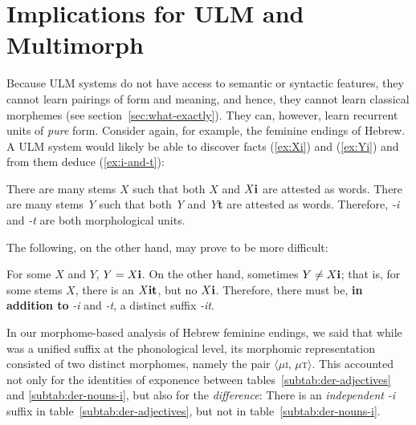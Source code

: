 \section{Implications for ULM and Multimorph}

Because ULM systems do not have access to
semantic or syntactic features, they cannot learn pairings of form and meaning, 
and hence, they cannot learn classical morphemes (see section~\ref{sec:what-exactly}). 
They can, however, learn recurrent units of \emph{pure} form. 
Consider again, 
for example, the feminine endings of Hebrew. A ULM system would likely be 
able to discover facts (\ref{ex:Xi}) and (\ref{ex:Yi}) and from them deduce (\ref{ex:i-and-t}): 
\begin{exe} \label{ex:observations1}
\ex \label{ex:Xi} There are many stems $X$ such that both $X$ and $X\text{\textbf{i}}$ are 
attested as words.
 \ex \label{ex:Yi} There are many stems \textit{Y} such that both \textit{Y} and \textit{Y}\textbf{t} 
 are attested as words.
\ex Therefore, \textit{-i} and \textit{-t} are both morphological units. \label{ex:i-and-t}
\end{exe}

The following, on the other hand, may prove to be more difficult:
\begin{exe} \label{ex:observations2}
\ex  \label{ex:YequalsXi} For some $X$ and $Y$, $Y=X\text{\textbf{i}}$. 
\ex  \label{ex:YneXi} On the other hand, sometimes $Y \ne X\text{\textbf{i}}$; that is, for some stems 
$X$, there is an $X\text{\textbf{it}}$, but no $X\text{\textbf{i}}$. 
\ex Therefore, there must be, \textbf{in addition to} \textit{-i} and \textit{-t}, 
a distinct suffix \textit{-it}.
\end{exe}
In our morphome-based analysis of Hebrew feminine endings, we said 
that while  was a unified suffix at the phonological level, its morphomic 
representation consisted of two distinct morphomes, namely the pair 
$\langle$$\mu$\textsc{i}, $\mu$\textsc{t}$\rangle$. 
This accounted
 not only for the identities of exponence between tables~\ref{subtab:der-adjectives} 
and \ref{subtab:der-nouns-i}, but also for the \emph{difference}: There is an \emph{independent} \textit{-i} suffix 
 in table~\ref{subtab:der-adjectives}, but not in %
 table~\ref{subtab:der-nouns-i}.

